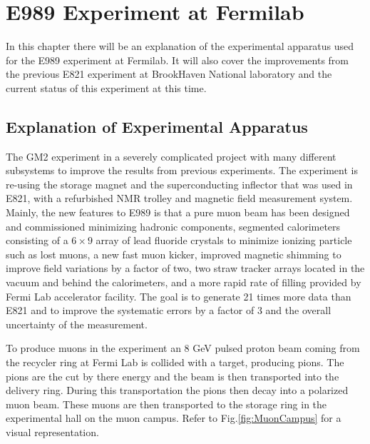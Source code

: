 \documentclass[./Thesis]{subfiles}
\begin{document}
\chapter{E989 Experiment at Fermilab}

In this chapter there will be an explanation of the experimental apparatus used for the E989 experiment at Fermilab. It will also cover the improvements from the previous E821 experiment at BrookHaven National laboratory and the current status of this experiment at this time.

\section{Explanation of Experimental Apparatus}

	The GM2 experiment in a severely complicated project with many different subsystems to improve the results from previous experiments. The experiment is re-using the storage magnet and the superconducting inflector that was used in E821, with a refurbished NMR trolley and magnetic field measurement system. Mainly, the new features to E989 is that a pure muon beam has been designed and commissioned minimizing hadronic components, segmented calorimeters consisting of a $6\times9$ array of lead fluoride crystals to minimize ionizing particle such as lost muons, a new fast muon kicker, improved magnetic shimming to improve field variations by a factor of two, two straw tracker arrays located in the vacuum and behind the calorimeters, and a more rapid rate of filling provided by Fermi Lab accelerator facility. The goal is to generate 21 times more data than E821 and to improve the systematic errors by a factor of 3 and the overall uncertainty of the measurement. \cite{TDR}


	To produce muons in the experiment an 8 GeV pulsed proton beam coming from the recycler ring at Fermi Lab is collided with a target, producing pions. The pions are the cut by there energy and the beam is then transported into the delivery ring. During this transportation the pions then decay into a polarized muon beam. These muons are then transported to the storage ring in the experimental hall on the muon campus. Refer to Fig.\ref{fig:MuonCampus} for a visual representation. \cite{aepps}
	
\end{document}
